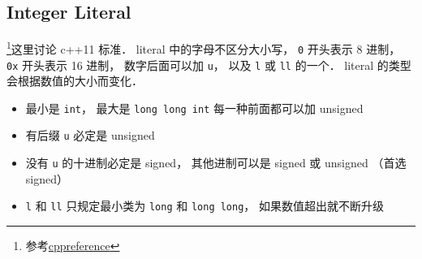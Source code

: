 \subsection{Integer Literal}
\footnote{参考\href{https://en.cppreference.com/w/cpp/language/integer_literal}{cppreference}}这里讨论 c++11 标准． literal 中的字母不区分大小写， \verb|0| 开头表示 8 进制，  \verb|0x| 开头表示 16 进制， 数字后面可以加 \verb|u|， 以及 \verb|l| 或 \verb|ll| 的一个． literal 的类型会根据数值的大小而变化．

\begin{itemize}
\item 最小是 \verb|int|， 最大是 \verb|long long int| 每一种前面都可以加 unsigned
\item 有后缀 \verb|u| 必定是 unsigned
\item 没有 \verb|u| 的十进制必定是 signed， 其他进制可以是 signed 或 unsigned （首选 signed）
\item \verb|l| 和 \verb|ll| 只规定最小类为 \verb|long| 和 \verb|long long|， 如果数值超出就不断升级
\end{itemize}
